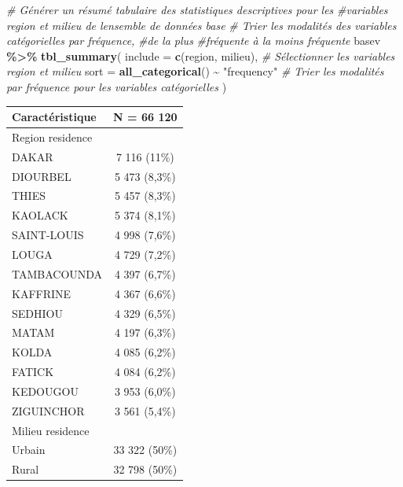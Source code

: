 \documentclass[
]{article}
\newenvironment{Shaded}{\begin{snugshade}}{\end{snugshade}}
\newcommand{\AttributeTok}[1]{\textcolor[rgb]{0.13,0.29,0.53}{#1}}
\newcommand{\CommentTok}[1]{\textcolor[rgb]{0.56,0.35,0.01}{\textit{#1}}}
\newcommand{\FunctionTok}[1]{\textcolor[rgb]{0.13,0.29,0.53}{\textbf{#1}}}
\newcommand{\NormalTok}[1]{#1}
\newcommand{\SpecialCharTok}[1]{\textcolor[rgb]{0.81,0.36,0.00}{\textbf{#1}}}
\newcommand{\StringTok}[1]{\textcolor[rgb]{0.31,0.60,0.02}{#1}}
\begin{document}
\begin{Shaded}
\begin{Highlighting}[]
\CommentTok{\# Générer un résumé tabulaire des statistiques descriptives pour les }
\CommentTok{\#variables \textquotesingle{}region\textquotesingle{} et \textquotesingle{}milieu\textquotesingle{} de l\textquotesingle{}ensemble de données \textquotesingle{}base\textquotesingle{}}
\CommentTok{\# Trier les modalités des variables catégorielles par fréquence,}
\CommentTok{\#de la plus }
\CommentTok{\#fréquente à la moins fréquente}
\NormalTok{basev }\SpecialCharTok{\%\textgreater{}\%}
  \FunctionTok{tbl\_summary}\NormalTok{(}
    \AttributeTok{include =} \FunctionTok{c}\NormalTok{(region, milieu),  }
    \CommentTok{\# Sélectionner les variables region et milieu}
    \AttributeTok{sort =} \FunctionTok{all\_categorical}\NormalTok{() }\SpecialCharTok{\textasciitilde{}} \StringTok{"frequency"}  
    \CommentTok{\# Trier les modalités par fréquence pour les variables catégorielles}
\NormalTok{  )}
\end{Highlighting}
\end{Shaded}

\begin{longtable}[]{@{}lc@{}}
\toprule\noalign{}
\textbf{Caractéristique} & \textbf{N = 66 120} \\
\midrule\noalign{}
\endhead
\bottomrule\noalign{}
\endlastfoot
Region residence & \\
DAKAR & 7 116 (11\%) \\
DIOURBEL & 5 473 (8,3\%) \\
THIES & 5 457 (8,3\%) \\
KAOLACK & 5 374 (8,1\%) \\
SAINT-LOUIS & 4 998 (7,6\%) \\
LOUGA & 4 729 (7,2\%) \\
TAMBACOUNDA & 4 397 (6,7\%) \\
KAFFRINE & 4 367 (6,6\%) \\
SEDHIOU & 4 329 (6,5\%) \\
MATAM & 4 197 (6,3\%) \\
KOLDA & 4 085 (6,2\%) \\
FATICK & 4 084 (6,2\%) \\
KEDOUGOU & 3 953 (6,0\%) \\
ZIGUINCHOR & 3 561 (5,4\%) \\
Milieu residence & \\
Urbain & 33 322 (50\%) \\
Rural & 32 798 (50\%) \\
\end{longtable}
\end{document}
